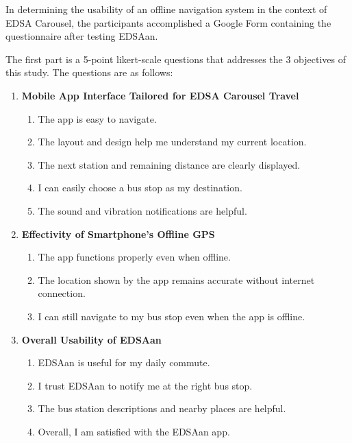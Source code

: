 \documentclass{icsthesis}
\begin{document}
\begin{mainmatter}
In determining the usability of an offline navigation system in the context of EDSA Carousel, the participants accomplished a Google Form containing the questionnaire after testing EDSAan.

The first part is a 5-point likert-scale questions that addresses the 3 objectives of this study. The questions are as follows:

\begin{enumerate}

\item \textbf{Mobile App Interface Tailored for EDSA Carousel Travel}
    \begin{enumerate}
        \item The app is easy to navigate.
        \item The layout and design help me understand my current location.
        \item The next station and remaining distance are clearly displayed.
        \item I can easily choose a bus stop as my destination.
        \item The sound and vibration notifications are helpful.
    \end{enumerate}

\item \textbf{Effectivity of Smartphone’s Offline GPS}
    \begin{enumerate}
        \item The app functions properly even when offline.
        \item The location shown by the app remains accurate without internet connection.
        \item I can still navigate to my bus stop even when the app is offline.
    \end{enumerate}
\item \textbf{Overall Usability of EDSAan}
    \begin{enumerate}
        \item EDSAan is useful for my daily commute.
        \item I trust EDSAan to notify me at the right bus stop.
        \item The bus station descriptions and nearby places are helpful.
        \item Overall, I am satisfied with the EDSAan app.
    \end{enumerate}

\end{enumerate}


\end{mainmatter}
\end{document}
